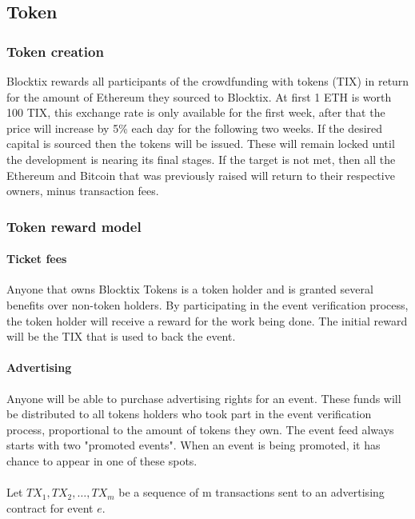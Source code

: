 \documentclass[a4paper]{article}
\begin{document}
\subsection{Token}
\subsubsection{Token creation}
Blocktix rewards all participants of the crowdfunding with tokens (TIX) in return for the amount of Ethereum they sourced to Blocktix. At first 1 ETH is worth 100 TIX, this exchange rate is only available for the first week, after that the price will increase by 5\% each day for the following two weeks. If the desired capital is sourced then the tokens will be issued. These will remain locked until the development is nearing its final stages. If the target is not met, then all the Ethereum and Bitcoin that was previously raised will return to their respective owners, minus transaction fees.

\subsubsection{Token reward model}
\paragraph{Ticket fees}
Anyone that owns Blocktix Tokens is a token holder and is granted several benefits over non-token holders.
By participating in the event verification process, the token holder will receive a reward for the work being done. The initial reward will be the TIX that is used to back the event.

\paragraph{Advertising}
Anyone will be able to purchase advertising rights for an event. These funds will be distributed to all tokens holders who took part in the event verification process, proportional to the amount of tokens they own. The event feed always starts with two "promoted events". When an event is being promoted, it has chance to appear in one of these spots.

\paragraph{} Let $TX_1, TX_2, \ldots, TX_m$ be a sequence of m transactions sent to an advertising contract for event $e$.
\end{document}
